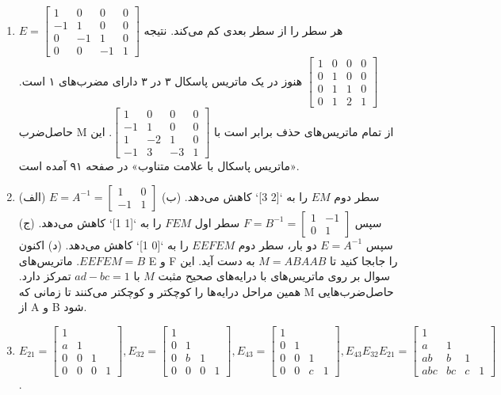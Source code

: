 \documentclass[12pt]{article}
\begin{document}
\begin{enumerate}
		\item $E= \begin{bmatrix} 1 & 0 & 0 & 0 \\ -1 & 1 & 0 & 0 \\ 0 & -1 & 1 & 0 \\ 0 & 0 & -1 & 1 \end{bmatrix}$ هر سطر را از سطر بعدی کم می‌کند. نتیجه $\begin{bmatrix} 1 & 0 & 0 & 0 \\ 0 & 1 & 0 & 0 \\ 0 & 1 & 1 & 0 \\ 0 & 1 & 2 & 1 \end{bmatrix}$ هنوز در یک ماتریس پاسکال ۳ در ۳ دارای مضرب‌های ۱ است. حاصل‌ضرب M از تمام ماتریس‌های حذف برابر است با $\begin{bmatrix} 1 & 0 & 0 & 0 \\ -1 & 1 & 0 & 0 \\ 1 & -2 & 1 & 0 \\ -1 & 3 & -3 & 1 \end{bmatrix}$. این «ماتریس پاسکال با علامت متناوب» در صفحه ۹۱ آمده است.
		
		\item (الف) $E=A^{-1}= \begin{bmatrix} 1 & 0 \\ -1 & 1 \end{bmatrix}$ سطر دوم $EM$ را به `[2 3]` کاهش می‌دهد. (ب) سپس $F=B^{-1}= \begin{bmatrix} 1 & -1 \\ 0 & 1 \end{bmatrix}$ سطر اول $FEM$ را به `[1 1]` کاهش می‌دهد. (ج) سپس $E=A^{-1}$ دو بار، سطر دوم $EEFEM$ را به `[0 1]` کاهش می‌دهد. (د) اکنون $EEFEM=B$. ماتریس‌های E و F را جابجا کنید تا $M=ABAAB$ به دست آید. این سوال بر روی ماتریس‌های با درایه‌های صحیح مثبت $M$ با $ad-bc=1$ تمرکز دارد. همین مراحل درایه‌ها را کوچکتر و کوچکتر می‌کنند تا زمانی که M حاصل‌ضرب‌هایی از A و B شود.
		
		\item $E_{21}= \begin{bmatrix} 1 & & & \\ a & 1 & & \\ 0 & 0 & 1 & \\ 0 & 0 & 0 & 1 \end{bmatrix}, E_{32}= \begin{bmatrix} 1 & & & \\ 0 & 1 & & \\ 0 & b & 1 & \\ 0 & 0 & 0 & 1 \end{bmatrix}, E_{43}= \begin{bmatrix} 1 & & & \\ 0 & 1 & & \\ 0 & 0 & 1 & \\ 0 & 0 & c & 1 \end{bmatrix}, E_{43}E_{32}E_{21}= \begin{bmatrix} 1 & & & \\ a & 1 & & \\ ab & b & 1 & \\ abc & bc & c & 1 \end{bmatrix}$.
		
	\end{enumerate}
	
\end{document}
